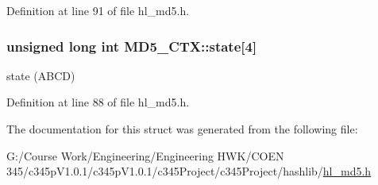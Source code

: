 Definition at line 91 of file hl\_\-md5.h.\hypertarget{struct_m_d5___c_t_x_a2f697997f51de65d08227fdf1d5c44b8}{
\subsubsection[{state}]{\setlength{\rightskip}{0pt plus 5cm}unsigned long int {\bf MD5\_\-CTX::state}\mbox{[}4\mbox{]}}}
\label{struct_m_d5___c_t_x_a2f697997f51de65d08227fdf1d5c44b8}
state (ABCD) 

Definition at line 88 of file hl\_\-md5.h.

The documentation for this struct was generated from the following file:\begin{DoxyCompactItemize}
\item 
G:/Course Work/Engineering/Engineering HWK/COEN 345/c345pV1.0.1/c345pV1.0.1/c345Project/c345Project/hashlib/\hyperlink{hl__md5_8h}{hl\_\-md5.h}\end{DoxyCompactItemize}
